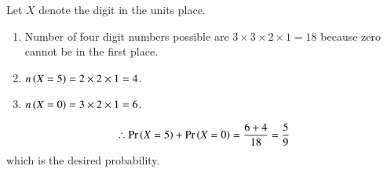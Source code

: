 Let $X$ denote the digit in the units place.  
\begin{enumerate}
	\item Number of four digit numbers possible are $3 \times 3 \times 2 \times 1 = 18$ because zero cannot be in the first place.
	\item $n\left(X=5\right) = 2 \times 2 \times 1 = 4$. 
	\item $n\left(X=0\right) = 3 \times 2 \times 1 = 6$. 
\end{enumerate}
\begin{align}
	\therefore \Pr\left(X=5\right)+\Pr\left(X=0\right) = \frac{6+4}{18}=\frac{5}{9}
\end{align}
which is the desired probability.
